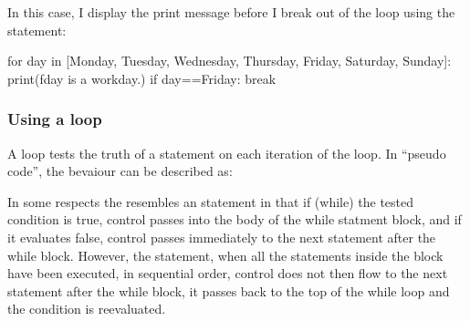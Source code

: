 \documentclass[letterpaper,10pt,english]{sphinxmanual}
\begin{document}
{In this case, I display the print message before I break out of the loop using the  statement:

{
\begin{sphinxVerbatim}[commandchars=\\\{\}]
\llap{\color{nbsphinxin}[ ]:\,\hspace{\fboxrule}\hspace{\fboxsep}}for day in [\PYGZsq{}Monday\PYGZsq{}, \PYGZsq{}Tuesday\PYGZsq{}, \PYGZsq{}Wednesday\PYGZsq{},
            \PYGZsq{}Thursday\PYGZsq{}, \PYGZsq{}Friday\PYGZsq{}, \PYGZsq{}Saturday\PYGZsq{}, \PYGZsq{}Sunday\PYGZsq{}]:
    print(f\PYGZdq{}\PYGZob{}day\PYGZcb{} is a workday.\PYGZdq{})
    if day==\PYGZsq{}Friday\PYGZsq{}:
        break
\end{sphinxVerbatim}
}


\subsubsection{Using a  loop}
\label{\detokenize{content/02_Robot_Lab/Section_00_01:Using-a-while...-loop}}
A  loop tests the truth of a statement on each iteration of the loop. In “pseudo code”, the bevaiour can be described as:

\begin{sphinxVerbatim}[commandchars=\\\{\}]
         


  

  

  

  

  


\end{sphinxVerbatim}

In some respects the  resembles an  statement in that if (while) the tested condition is true, control passes into the body of the while statment block, and if it evaluates false, control passes immediately to the next statement after the while block. However,  the  statement, when all the statements inside the  block have been executed, in sequential order, control does not then flow to the next statement after the while block, it passes back to the top of
the while loop and the condition is re\sphinxhyphen{}evaluated.

}
\end{document}
